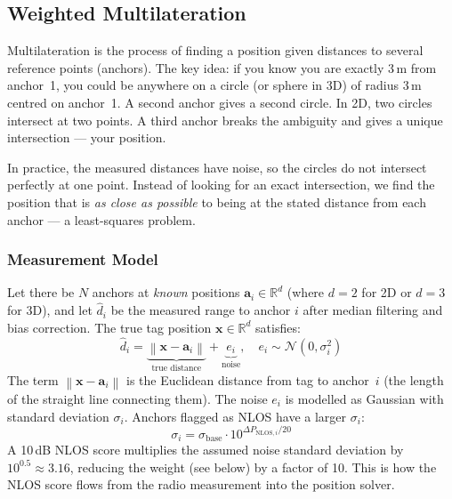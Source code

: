 \documentclass[11pt,a4paper]{article}
\newcommand{\vect}[1]{\bm{#1}}
\newcommand{\norm}[1]{\left\|#1\right\|}
\begin{document}
\subsection{Weighted Multilateration}

\begin{intubox}
Multilateration is the process of finding a position given distances to several reference points (anchors). The key idea: if you know you are exactly 3\,m from anchor~1, you could be anywhere on a circle (or sphere in 3D) of radius 3\,m centred on anchor~1. A second anchor gives a second circle. In 2D, two circles intersect at two points. A third anchor breaks the ambiguity and gives a unique intersection --- your position.

In practice, the measured distances have noise, so the circles do not intersect perfectly at one point. Instead of looking for an exact intersection, we find the position that is \emph{as close as possible} to being at the stated distance from each anchor --- a least-squares problem.
\end{intubox}

\subsubsection{Measurement Model}

Let there be $N$ anchors at \emph{known} positions $\vect{a}_i \in \mathbb{R}^d$ (where $d=2$ for 2D or $d=3$ for 3D), and let $\hat{d}_i$ be the measured range to anchor $i$ after median filtering and bias correction. The true tag position $\vect{x} \in \mathbb{R}^d$ satisfies:
\begin{equation}
\hat{d}_i = \underbrace{\norm{\vect{x} - \vect{a}_i}}_{\text{true distance}} + \underbrace{e_i}_{\text{noise}}, \quad e_i \sim \mathcal{N}(0, \sigma_i^2)
\label{eq:measurement}
\end{equation}
The term $\norm{\vect{x} - \vect{a}_i}$ is the Euclidean distance from tag to anchor~$i$ (the length of the straight line connecting them). The noise $e_i$ is modelled as Gaussian with standard deviation $\sigma_i$. Anchors flagged as NLOS have a larger $\sigma_i$:
\begin{equation}
\sigma_i = \sigma_\text{base} \cdot 10^{\Delta P_{\text{NLOS},i} / 20}
\label{eq:sigma}
\end{equation}
A 10\,dB NLOS score multiplies the assumed noise standard deviation by $10^{0.5} \approx 3.16$, reducing the weight (see below) by a factor of 10. This is how the NLOS score flows from the radio measurement into the position solver.
\end{document}
